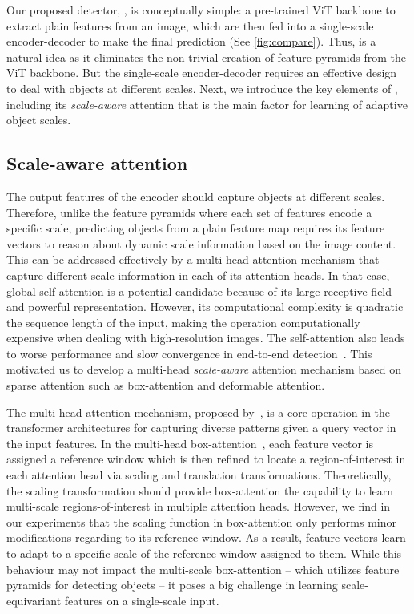 Our proposed detector, \ours, is conceptually simple: a pre-trained ViT backbone to extract plain features from an image, which are then fed into a single-scale encoder-decoder to make the final prediction (See \cref{fig:compare}). Thus, \ours is a natural idea as it eliminates the non-trivial creation of feature pyramids from the ViT backbone. But the single-scale encoder-decoder requires an effective design to deal with objects at different scales. Next, we introduce the key elements of \ours, including its \emph{scale-aware} attention that is the main factor for learning of adaptive object scales.

\subsection{Scale-aware attention}

The output features of the encoder should capture objects at different scales. Therefore, unlike the feature pyramids where each set of features encode a specific scale, predicting objects from a plain feature map requires its feature vectors to reason about dynamic scale information based on the image content. This can be addressed effectively by a multi-head attention mechanism that capture different scale information in each of its attention heads. 
In that case, global self-attention is a potential candidate because of its large receptive field and powerful representation. However, its computational complexity is quadratic \wrt the sequence length of the input, making the operation computationally expensive when dealing with high-resolution images. The self-attention also leads to worse performance and slow convergence in end-to-end detection~\cite{zhu2021deformable}. This motivated us to develop a multi-head \emph{scale-aware} attention mechanism based on sparse attention such as box-attention and deformable attention.

 The multi-head attention mechanism, proposed by~\cite{vaswani2017transformer}, is a core operation in the transformer architectures for capturing diverse patterns given a query vector in the input features. In the multi-head box-attention~\cite{nguyen2022boxer}, each feature vector is assigned a reference window which is then refined to locate a region-of-interest in each attention head via scaling and translation transformations. Theoretically, the scaling transformation should provide box-attention the capability to learn multi-scale regions-of-interest in multiple attention heads. However, we find in our experiments that the scaling function in box-attention only performs minor modifications regarding to its reference window. As a result, feature vectors learn to adapt to a specific scale of the reference window assigned to them. While this behaviour may not impact the multi-scale box-attention -- which utilizes feature pyramids for detecting objects -- it poses a big challenge in learning scale-equivariant features on a single-scale input.

